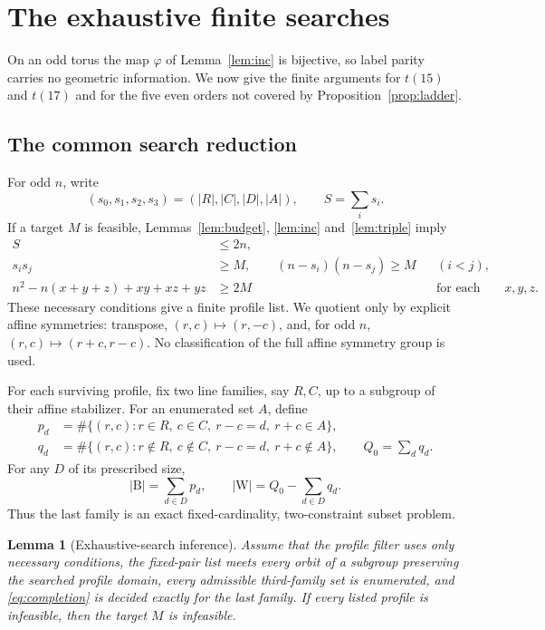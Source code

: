 \documentclass[11pt]{amsart}
\newtheorem{lemma}[theorem]{Lemma}
\theoremstyle{definition}
\theoremstyle{remark}
\newcommand{\Bl}{\mathrm{B}}
\newcommand{\Wh}{\mathrm{W}}
\begin{document}
\section{The exhaustive finite searches}\label{sec:odd}

On an odd torus the map $\varphi$ of Lemma~\ref{lem:inc} is bijective, so
label parity carries no geometric information.  We now give the finite
arguments for $t(15)$ and $t(17)$ and for the five even orders not covered by
Proposition~\ref{prop:ladder}.

\subsection{The common search reduction}\label{ssec:search}

For odd $n$, write
\[
(s_0,s_1,s_2,s_3)=(|R|,|C|,|D|,|A|),\qquad S=\sum_i s_i.
\]
If a target $M$ is feasible, Lemmas~\ref{lem:budget},
\ref{lem:inc} and~\ref{lem:triple} imply
\begin{align}
S&\le2n,\label{eq:oddprofile1}\\
s_is_j&\ge M,\qquad (n-s_i)(n-s_j)\ge M
&& (i<j),\label{eq:oddprofile2}\\
n^2-n(x+y+z)+xy+xz+yz&\ge2M
&&\text{for each triple }x,y,z.\label{eq:oddprofile3}
\end{align}
These necessary conditions give a finite profile list.  We quotient only by
explicit affine symmetries: transpose, $(r,c)\mapsto(r,-c)$, and, for odd
$n$, $(r,c)\mapsto(r+c,r-c)$.  No classification of the full affine
symmetry group is used.

For each surviving profile, fix two line families, say $R,C$, up to a
subgroup of their affine stabilizer.  For an enumerated set $A$, define
\[
\begin{aligned}
p_d&=\#\{(r,c):r\in R,\ c\in C,\ r-c=d,\ r+c\in A\},\\
q_d&=\#\{(r,c):r\notin R,\ c\notin C,\ r-c=d,\ r+c\notin A\},\qquad
Q_0=\sum_d q_d .
\end{aligned}
\]
For any $D$ of its prescribed size,
\begin{equation}\label{eq:completion}
|\Bl|=\sum_{d\in D}p_d,\qquad
|\Wh|=Q_0-\sum_{d\in D}q_d.
\end{equation}
Thus the last family is an exact fixed-cardinality, two-constraint subset
problem.

\begin{lemma}[Exhaustive-search inference]\label{lem:searchsound}
Assume that the profile filter uses only necessary conditions, the fixed-pair
list meets every orbit of a subgroup preserving the searched profile domain,
every admissible third-family set is enumerated, and
\eqref{eq:completion} is decided exactly for the last family.  If every
listed profile is infeasible, then the target $M$ is infeasible.
\end{lemma}
\end{document}
